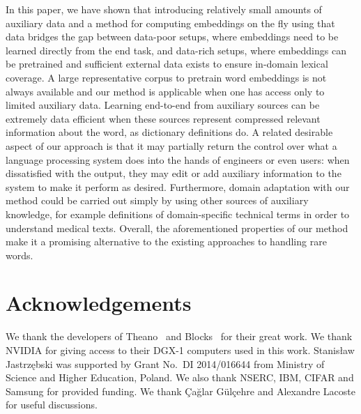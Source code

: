 In this paper, we have shown that introducing relatively small amounts of auxiliary data and a method for computing embeddings on the fly using that data bridges the gap between data-poor setups, where embeddings need to be learned directly from the end task, and data-rich setups, where embeddings can be pretrained and sufficient external data exists to ensure in-domain lexical coverage.  
A large representative corpus to pretrain word embeddings is not always available and our method is applicable when one has access only to limited auxiliary data. 
Learning end-to-end from auxiliary sources can be extremely data efficient when these sources represent compressed relevant information about the word, as dictionary definitions do. 
A related desirable aspect of our approach is that it may partially return the control over what a language processing system does into the hands of engineers or even users: when dissatisfied with the output, they may edit or add auxiliary information to the system to make it perform as desired. 
Furthermore, domain adaptation with our method could be carried out simply by using other sources of auxiliary knowledge, for example definitions of domain-specific technical terms in order to understand medical texts. Overall, the aforementioned properties of our method make it a promising alternative to the existing approaches to handling rare words.



\small

\section*{Acknowledgements}
We thank the developers of Theano~\citep{team2016theano} and Blocks~\citep{blocksfuel} for their great work. 
We thank NVIDIA for giving access to their DGX-1 computers used in this work. Stanisław Jastrzębski  was supported by Grant No.~DI 2014/016644 from Ministry of Science and Higher Education, Poland. We also thank NSERC, IBM, CIFAR and Samsung for provided funding. We thank Çağlar Gülçehre
and Alexandre Lacoste for useful discussions. 






